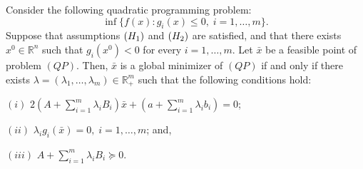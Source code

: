 \documentclass[10pt,a4paper]{amsart}
\begin{document}
	\begin{proposition}\label{pro1}
		Consider the following quadratic programming problem:
		\begin{equation}\tag{$QP$}
			\inf\{f(x): g_i(x)\leq 0,\; i=1, \ldots, m\}.
		\end{equation}
		Suppose that assumptions $({\rm H_1})$ and $({\rm H_2})$ are satisfied, and that there exists
		$x^0\in \mathbb{R}^n$ such that $g_i(x^0)<0$ for every $i=1, \ldots, m$.
		Let $\bar x$ be a feasible point of problem $(QP)$.
		Then, $\bar x$ is a global minimizer of $(QP)$ if and only if there exists
		$\lambda=(\lambda_1,\ldots,\lambda_m)\in \mathbb{R}^m_+$ such that the following conditions hold:
		\begin{description}
			\item{$(i)$} $2(A+\sum_{i=1}^{m}\lambda_iB_i)\bar x+ (a+\sum_{i=1}^{m}\lambda_ib_i)=0$;
			\item{$(ii)$} $\lambda_ig_i(\bar x)=0, \; i=1, \ldots,m$; and,
			\item{$(iii)$} $A+\sum_{i=1}^{m}\lambda_iB_i\succeq 0.$
		\end{description}
	\end{proposition}
\end{document}
